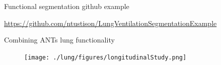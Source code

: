 \documentclass[ignorenonframetext,]{beamer}
\begin{document}
\begin{frame}{Functional segmentation github example}

\url{https://github.com/ntustison/LungVentilationSegmentationExample}

\end{frame}

\begin{frame}{Combining ANTs lung functionality}

\centering

\begin{figure}
\texttt{[image: ./lung/figures/longitudinalStudy.png]}
\end{figure}

\hypertarget{refs}{}

\end{frame}
\end{document}
